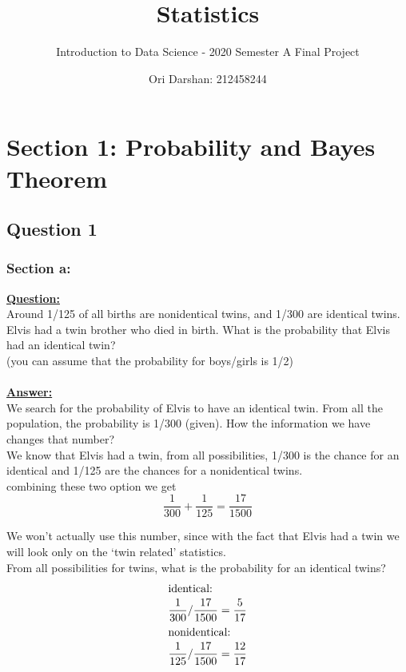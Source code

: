 \documentclass[a4, 12pt,titlepage]{scrartcl}
\title{Statistics}
\subtitle{Introduction to Data Science - 2020 Semester A Final Project}
\author{Ori Darshan: 212458244}
\date{}
\begin{document}
\maketitle

\bigskip
\section{Section 1: Probability and Bayes Theorem}
\subsection{Question 1}
\subsubsection{Section a:}
\textbf{\underline{Question:}}\\
Around 1/125 of all births are nonidentical twins, and 1/300 are identical twins. Elvis had a twin brother who died in birth. What is the probability that Elvis had an identical twin?\\
(you can assume that the probability for boys/girls is 1/2)\\\smallskip\\
\textbf{\underline{Answer:}}\\
We search for the probability of Elvis to have an identical twin.
From all the population, the probability is 1/300 (given). How the information we have changes that number?\\
We know that Elvis had a twin, from all possibilities, 1/300 is the chance for an identical and 1/125 are the chances for a nonidentical twins.\\
combining these two option we get\[
\frac{1}{300}+\frac{1}{125}=\frac{17}{1500}
\]

We won't actually use this number, since with the fact that Elvis had a twin we will look only on the `twin related' statistics.\\
From all possibilities for twins, what is the probability for an identical twins?\begin{align*}
\intertext{identical:}
\frac{1}{300}/\frac{17}{1500}&=\frac{5}{17}\\
\intertext{nonidentical:}
\frac{1}{125}/\frac{17}{1500}&=\frac{12}{17}\\
\end{align*}
\end{document}
